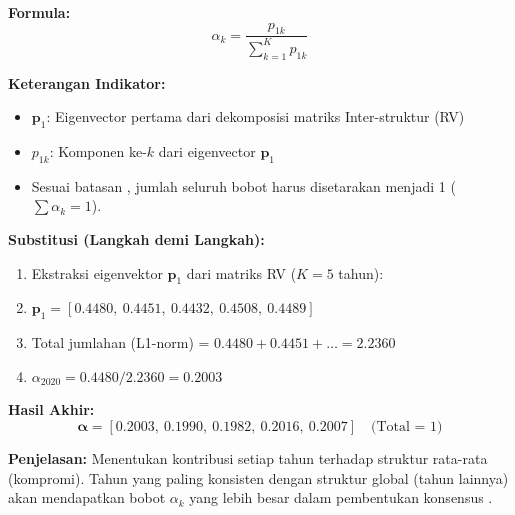\documentclass[11pt,a4paper]{article}
\begin{document}
\begin{tcolorbox}[formula_box, title={15. Bobot Optimal Kompromi ($\alpha_k$)}]
\textbf{Formula:}
\[ \alpha_k = \frac{p_{1k}}{\sum_{k=1}^{K} p_{1k}} \]

\textbf{Keterangan Indikator:}
\begin{itemize}
  \item $\mathbf{p}_1$: Eigenvector pertama dari dekomposisi matriks Inter-struktur (RV)
  \item $p_{1k}$: Komponen ke-$k$ dari eigenvector $\mathbf{p}_1$
  \item Sesuai batasan \citet{lavit94}, jumlah seluruh bobot harus disetarakan menjadi 1 ($\sum \alpha_k = 1$).
\end{itemize}

\textbf{Substitusi (Langkah demi Langkah):}
\begin{enumerate}
  \item Ekstraksi eigenvektor $\mathbf{p}_1$ dari matriks RV ($K=5$ tahun):
  \item $\mathbf{p}_1 = [0.4480,\ 0.4451,\ 0.4432,\ 0.4508,\ 0.4489]$
  \item Total jumlahan (L1-norm) = $0.4480 + 0.4451 + \dots = 2.2360$
  \item $\alpha_{2020} = 0.4480 / 2.2360 = 0.2003$
\end{enumerate}

\textbf{Hasil Akhir:}
\[ \boldsymbol{\alpha} = [0.2003,\ 0.1990,\ 0.1982,\ 0.2016,\ 0.2007] \quad \text{(Total = 1)} \]

\textbf{Penjelasan:} Menentukan kontribusi setiap tahun terhadap struktur rata-rata (kompromi). Tahun yang paling konsisten dengan struktur global (tahun lainnya) akan mendapatkan bobot $\alpha_k$ yang lebih besar dalam pembentukan konsensus \citet{lavit94}.
\end{tcolorbox}
\end{document}
